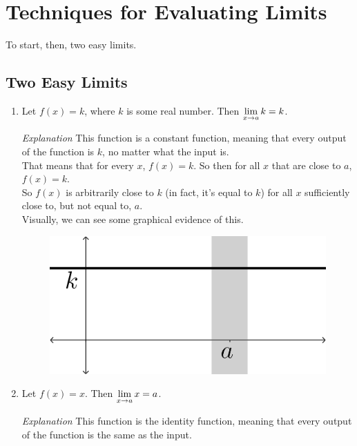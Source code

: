 \section{Techniques for Evaluating Limits}


To start, then, two easy limits.

\subsection*{Two Easy Limits}
\begin{enumerate}
  \item Let $f(x) = k$, where $k$ is some real number.
  Then $\displaystyle \lim_{x\to a} k = k$.

  \begin{describe}{\textit{Explanation}}
    This function is a constant function, meaning that every output of the function is $k$, no matter what the input is.\\

    That means that for every $x$, $f(x) = k$. So then for all $x$ that are close to $a$, $f(x) = k$.\\

    So $f(x)$ is arbitrarily close to $k$ (in fact, it's equal to $k$) for all $x$ sufficiently close to, but not equal to, $a$.\\

    Visually, we can see some graphical evidence of this.
    \begin{figure}[h!tb]
      \includegraphics[scale=0.5]{./1_limits/images/1-2_graph1.png}
      \centering
    \end{figure}
  \end{describe}
  \item Let $f(x) = x$. Then $\displaystyle \lim_{x\to a} x = a$.

  \begin{describe}{\textit{Explanation}}
    This function is the identity function, meaning that every output of the function is the same as the input.\\


\end{describe}
\end{enumerate}
